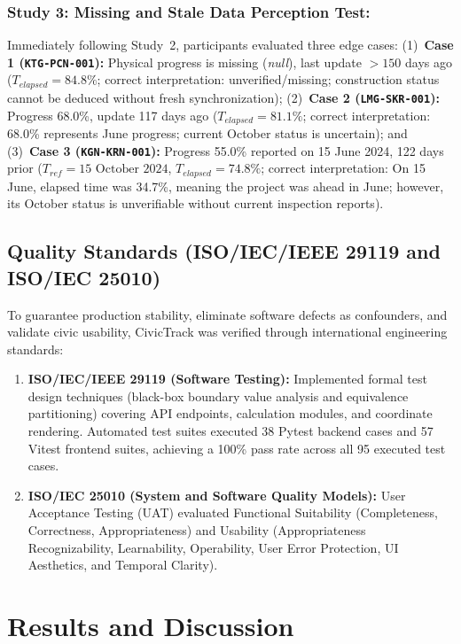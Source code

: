 \documentclass[runningheads]{llncs}
\begin{document}
\subsubsection{Study 3: Missing and Stale Data Perception Test:}
Immediately following Study~2, participants evaluated three edge cases: (1)~\textbf{Case 1 (\texttt{KTG-PCN-001}):} Physical progress is missing (\emph{null}), last update $>150$ days ago ($T_{elapsed} = 84.8\%$; correct interpretation: unverified/missing; construction status cannot be deduced without fresh synchronization); (2)~\textbf{Case 2 (\texttt{LMG-SKR-001}):} Progress 68.0\%, update 117 days ago ($T_{elapsed} = 81.1\%$; correct interpretation: 68.0\% represents June progress; current October status is uncertain); and (3)~\textbf{Case 3 (\texttt{KGN-KRN-001}):} Progress 55.0\% reported on 15 June 2024, 122 days prior ($T_{ref} = \text{15 October 2024}$, $T_{elapsed} = 74.8\%$; correct interpretation: On 15 June, elapsed time was 34.7\%, meaning the project was ahead in June; however, its October status is unverifiable without current inspection reports).

\subsection{Quality Standards (ISO/IEC/IEEE 29119 and ISO/IEC 25010)}
To guarantee production stability, eliminate software defects as confounders, and validate civic usability, CivicTrack was verified through international engineering standards:
\begin{enumerate}\setlength{\itemsep}{1.2pt}\setlength{\parskip}{0pt}
    \item \textbf{ISO/IEC/IEEE 29119 (Software Testing):} Implemented formal test design techniques (black-box boundary value analysis and equivalence partitioning) covering API endpoints, calculation modules, and coordinate rendering. Automated test suites executed 38 Pytest backend cases and 57 Vitest frontend suites, achieving a 100\% pass rate across all 95 executed test cases.
    \item \textbf{ISO/IEC 25010 (System and Software Quality Models):} User Acceptance Testing (UAT) evaluated Functional Suitability (Completeness, Correctness, Appropriateness) and Usability (Appropriateness Recognizability, Learnability, Operability, User Error Protection, UI Aesthetics, and Temporal Clarity).
\end{enumerate}

\section{Results and Discussion}
\end{document}
